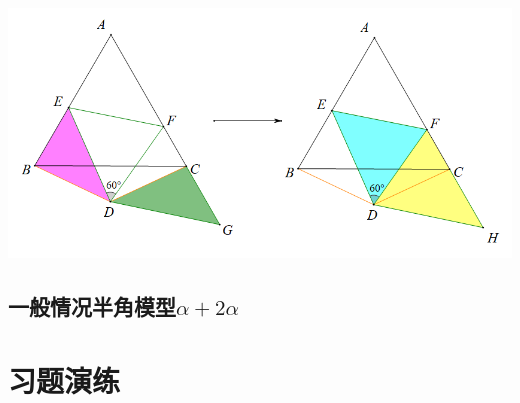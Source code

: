 \documentclass[10pt]{ctexart}
\begin{document}
\includegraphics[scale=0.4]{figure/banjiao11.PNG}

\subsection{一般情况半角模型$\alpha +2\alpha$}




\section{习题演练}
\end{document}
